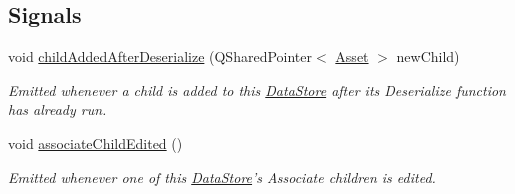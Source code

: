 \subsection*{Signals}
\begin{DoxyCompactItemize}
\item 
void \hyperlink{class_picto_1_1_data_store_ae3b09c56bc028ba811564096eb5272b9}{child\-Added\-After\-Deserialize} (Q\-Shared\-Pointer$<$ \hyperlink{class_picto_1_1_asset}{Asset} $>$ new\-Child)
\begin{DoxyCompactList}\small\item\em Emitted whenever a child is added to this \hyperlink{class_picto_1_1_data_store}{Data\-Store} after its Deserialize function has already run. \end{DoxyCompactList}\item 
\hypertarget{class_picto_1_1_data_store_a6ce48ec1f3432d4ad58ddf3f8d9323b5}{void \hyperlink{class_picto_1_1_data_store_a6ce48ec1f3432d4ad58ddf3f8d9323b5}{associate\-Child\-Edited} ()}\label{class_picto_1_1_data_store_a6ce48ec1f3432d4ad58ddf3f8d9323b5}

\begin{DoxyCompactList}\small\item\em Emitted whenever one of this \hyperlink{class_picto_1_1_data_store}{Data\-Store}'s Associate children is edited. \end{DoxyCompactList}\end{DoxyCompactItemize}
